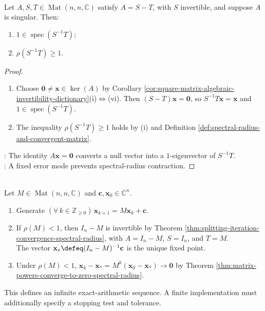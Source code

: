 \begin{corollary} \label{cor:singular-matrix-splitting-obstruction} \\
Let $A,S,T\in\operatorname{Mat}(n,n,\mathbb{C})$ satisfy $A=S-T$, with $S$ invertible, and suppose $A$ is singular. Then:
\begin{enumerate}[label=(\roman*)]
\setlength{\itemsep}{0pt}
\item $1\in\operatorname{spec}(S^{-1}T)$;
\item $\rho(S^{-1}T)\geq1$.
\end{enumerate}
\begin{proof}
\begin{enumerate}[label=(\roman*)]
\setlength{\itemsep}{0pt}
\item Choose $\mathbf{0}\neq\mathbf{x}\in\ker(A)$ by Corollary \ref{cor:square-matrix-algebraic-invertibility-dictionary}(i)$\Leftrightarrow$(vi). Then $(S-T)\mathbf{x}=\mathbf{0}$, so $S^{-1}T\mathbf{x}=\mathbf{x}$ and $1\in\operatorname{spec}(S^{-1}T)$.
\item The inequality $\rho(S^{-1}T)\geq1$ holds by (i) and Definition \ref{def:spectral-radius-and-convergent-matrix}.
\end{enumerate}
: The identity $A\mathbf{x}=\mathbf{0}$ converts a null vector into a $1$-eigenvector of $S^{-1}T$.\\
: A fixed error mode prevents spectral-radius contraction.
\end{proof}
\end{corollary}

\begin{computationmethod} \label{meth:stationary-iterative-method} \\
Let $M\in\operatorname{Mat}(n,n,\mathbb{C})$ and $\mathbf{c},\mathbf{x}_0\in\mathbb{C}^n$.
\begin{enumerate}[label=(\roman*)]
\setlength{\itemsep}{0pt}
\item Generate $(\forall\,k\in\mathbb{Z}_{\geq0})\,\mathbf{x}_{k+1}=M\mathbf{x}_k+\mathbf{c}$.
\item If $\rho(M)<1$, then $I_n-M$ is invertible by Theorem \ref{thm:splitting-iteration-convergence-spectral-radius}, with $A=I_n-M$, $S=I_n$, and $T=M$.\\
The vector $\mathbf{x}_*\defeq(I_n-M)^{-1}\mathbf{c}$ is the unique fixed point.
\item Under $\rho(M)<1$, $\mathbf{x}_k-\mathbf{x}_*=M^k(\mathbf{x}_0-\mathbf{x}_*)\to\mathbf{0}$ by Theorem \ref{thm:matrix-powers-converge-to-zero-spectral-radius}.
\end{enumerate}
This defines an infinite exact-arithmetic sequence. A finite implementation must additionally specify a stopping test and tolerance.
\end{computationmethod}

